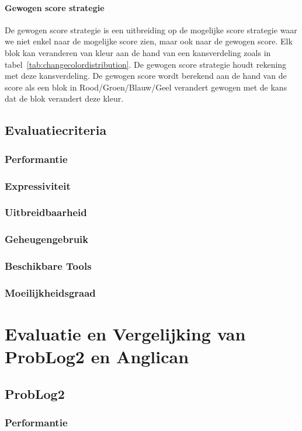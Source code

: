 \documentclass[12pt,a4paper,oneside]{book}
\theoremstyle{definition}
\begin{document}
\subsubsection{Gewogen score strategie}
De gewogen score strategie is een uitbreiding op de mogelijke score strategie waar we niet enkel naar de mogelijke score zien, maar ook naar de gewogen score. Elk blok kan veranderen van kleur aan de hand van een kansverdeling zoals in tabel~\ref{tab:changecolordistribution}. De gewogen score strategie houdt rekening met deze kansverdeling. De gewogen score wordt berekend aan de hand van de score als een blok in Rood/Groen/Blauw/Geel verandert gewogen met de kans dat de blok verandert deze kleur.
\section{Evaluatiecriteria}
\label{sec:uitwerkingEvaluatiecriteria}
\subsection{Performantie}
\subsection{Expressiviteit}
\subsection{Uitbreidbaarheid}
\subsection{Geheugengebruik}
\subsection{Beschikbare Tools}
\subsection{Moeilijkheidsgraad}

\chapter{Evaluatie en Vergelijking van ProbLog2 en Anglican}
\label{ch:evaluatie}
\section{ProbLog2}
\label{sec:evaluatieProbLog2}
\subsection{Performantie}
\end{document}
